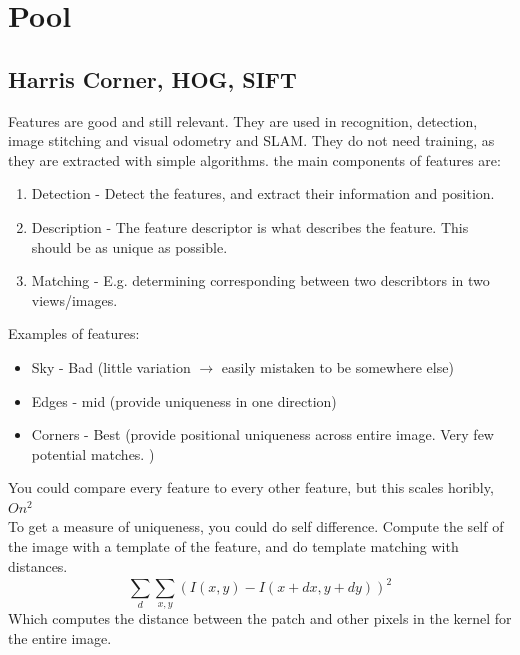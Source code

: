 \documentclass[a4paper]{article}
\begin{document}
\section{Pool}
\raggedright
\newpage
\subsection{Harris Corner, HOG, SIFT}
Features are good and still relevant. They are used in recognition, detection, image stitching and visual odometry and SLAM. They do not need training, as they are extracted with simple algorithms. 
the main components of features are:
\begin{enumerate}
	\item Detection - Detect the features, and extract their information and position.
	\item Description - The feature descriptor is what describes the feature. This should be as unique as possible.
	\item Matching - E.g. determining corresponding between two describtors in two views/images. 
\end{enumerate}

Examples of features:
\begin{itemize}
	\item Sky - Bad (little variation $ \rightarrow  $ easily mistaken to be somewhere else)
	\item Edges - mid (provide uniqueness in one direction)
	\item Corners - Best (provide positional uniqueness across entire image. Very few potential matches. )
\end{itemize}

You could compare every feature to every other feature, but this scales horibly, $ O n^{2} $\\
To get a measure of uniqueness, you could do self difference. Compute the self of the image with a template of the feature, and do template matching with distances.
\begin{equation}\label{eq:self_difference}
	\sum_{d}^{}{\sum_{x,y}^{}{(I(x,y) - I(x+dx, y+dy))^{2} }}
\end{equation}
Which computes the distance between the patch and other pixels in the kernel for the entire image. 
\end{document}

